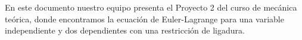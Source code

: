 
\noindent 				%
En este documento nuestro equipo presenta el Proyecto 2 del curso de mecánica teórica, 
donde encontramos la ecuación de Euler-Lagrange para una variable independiente y dos dependientes
con una restricción de ligadura.